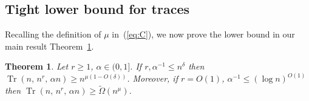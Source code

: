 \documentclass[11pt]{article}
\newtheorem{theo}{Theorem}[section]
\newtheorem{theo}{Theorem}[section]
\renewcommand{\a}{\alpha}
\renewcommand{\d}{\delta}
\newcommand{\C}{\mu}
\DeclareMathOperator{\trace}{Tr}
\begin{document}
	
%

\subsection{Tight lower bound for traces}\label{sec:traces}

Recalling the definition of $\C$ in~(\ref{eq:C}), we now prove the lower bound in our main result Theorem~\ref{th:main}.

\begin{theo} 
	\label{th:main}
	Let $r \ge 1$, $\a \in (0,1]$. If $r, \a^{-1} \le n^{\d}$ then
	$\trace(n,\,n^r,\,\a n) \ge n^{\C(1-O(\d))}$.
	Moreover, if $r=O(1)$, $\a^{-1} \le (\log n)^{O(1)}$ then $\trace(n,\,n^r,\,\a n) \ge \tilde\Omega(n^\C)$.
\end{theo}
\end{document}
